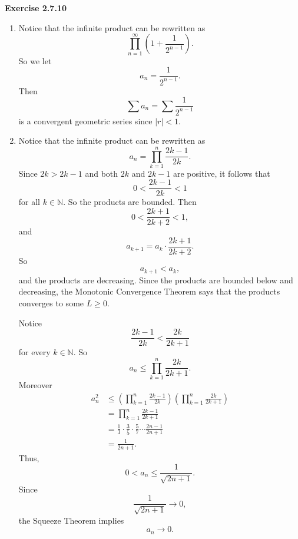\documentclass[12pt]{article}
\begin{document}
\textbf{Exercise 2.7.10}
\begin{enumerate}[label=(\alph*)]
    \item Notice that the infinite product can be rewritten as
          \[
              \prod_{n=1}^{\infty } (1 + \frac{1}{2^{n-1}}).
          \]
          So we let
          \[
              a_n = \frac{1}{2^{n-1}}.
          \]
          Then
          \[
              \sum a_n = \sum \frac{1}{2^{n-1}}
          \]
          is a convergent geometric series since \( \vert r \vert < 1 \).

    \item Notice that the infinite product can be rewritten as
          \[
              a_n = \prod_{k=1}^{n} \frac{2k-1}{2k}.
          \]
          Since \( 2k > 2k - 1 \) and both \( 2k \) and \( 2k - 1 \) are positive, it follows that
          \[
              0 < \frac{2k-1}{2k} < 1
          \]
          for all \( k \in \mathbb{N} \). So the products are bounded. Then
          \[
              0 < \frac{2k+1}{2k+2} < 1,
          \]
          and
          \[
              a_{k+1} = a_k \cdot \frac{2k+1}{2k+2}.
          \]
          So
          \[
              a_{k+1} < a_k,
          \]
          and the products are decreasing.
          Since the products are bounded below and decreasing, the Monotonic Convergence Theorem says that
          the products converges to some \( L \geq 0 \).

          Notice
          \[
              \frac{2k-1}{2k} < \frac{2k}{2k+1}
          \]
          for every \( k \in \mathbb{N} \).
          So
          \[
              a_n \leq \prod_{k=1}^{n} \frac{2k}{2k+1}.
          \]
          Moreover
          \[
              \begin{aligned}
                  a_n^2
                   & \le \left(\prod_{k=1}^{n}\frac{2k-1}{2k}\right)
                  \left(\prod_{k=1}^{n}\frac{2k}{2k+1}\right)                \\
                   & =\prod_{k=1}^{n}\frac{2k-1}{2k+1}                       \\
                   & =\frac13\cdot\frac35\cdot\frac57\cdots\frac{2n-1}{2n+1} \\
                   & =\frac1{2n+1}.
              \end{aligned}
          \]
          Thus,
          \[
              0<a_n\le\frac1{\sqrt{2n+1}}.
          \]
          Since
          \[
              \frac1{\sqrt{2n+1}} \to 0,
          \]
          the Squeeze Theorem implies
          \[
              a_n \to 0.
          \]


\end{enumerate}
\end{document}
